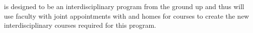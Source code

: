 

\short{} is designed to be an interdisciplinary program from the
ground up and thus will use faculty with joint appointments with
\aim{} and homes for courses to create the new interdisciplinary
courses required for this program.
